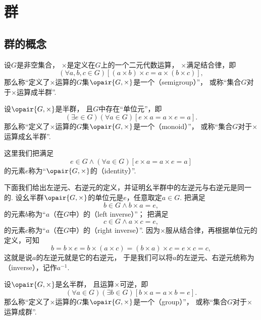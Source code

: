 \section{群}
\subsection{群的概念}
\begin{definition}\label{definition:抽象代数.半群的定义}
设\(G\)是非空集合，
\(\times\)是定义在\(G\)上的一个二元代数运算，
\(\times\)满足结合律，即\[
	(\forall a,b,c \in G)
	[(a \times b) \times c = a \times (b \times c)],
\]
那么称“定义了\(\times\)运算的\(G\)集\(\opair{G,\times}\)是一个（semigroup）”，
或称“集合\(G\)对于\(\times\)运算成半群”.
\end{definition}

\begin{definition}\label{definition:抽象代数.幺半群的定义}
设\(\opair{G,\times}\)是半群，
且\(G\)中存在“单位元”，即\[
	(\exists e \in G)(\forall a \in G)
	[e \times a = a \times e = a].
\]
那么称“定义了\(\times\)运算的\(G\)集\(\opair{G,\times}\)是一个（monoid）”，
或称“集合\(G\)对于\(\times\)运算成幺半群”.

这里我们把满足\[
	e \in G
	\land
    (\forall a \in G)
    [e \times a = a \times e = a]
\]的元素\(e\)称为“\(\opair{G,\times}\)的（identity）”.
\end{definition}

下面我们给出左逆元、右逆元的定义，并证明幺半群中的左逆元与右逆元是同一的.
设幺半群\(\opair{G,\times}\)的单位元是\(e\)，任意取定\(a \in G\).
把满足\[
	b \in G
	\land
	b \times a = e,
\]的元素\(b\)称为“\(a\)（在\(G\)中）的（left inverse）”；
把满足\[
	c \in G
	\land
	a \times c = e,
\]的元素\(c\)称为“\(a\)（在\(G\)中）的（right inverse）”.
因为\(\times\)服从结合律，再根据单位元的定义，可知\[
	b = b \times e = b \times (a \times c) = (b \times a) \times c = e \times c = c,
\]
这就是说\(a\)的左逆元就是它的右逆元，
于是我们可以将\(a\)的左逆元、右逆元统称为（inverse），记作\(a^{-1}\).

\begin{definition}\label{definition:抽象代数.群的定义}
设\(\opair{G,\times}\)是幺半群，
且运算\(\times\)可逆，即\[
	(\forall a \in G)(\exists b \in G)
	[b \times a = a \times b = e].
\]
那么称“定义了\(\times\)运算的\(G\)集\(\opair{G,\times}\)是一个（group）”，
或称“集合\(G\)对于\(\times\)运算成群”.
\end{definition}

